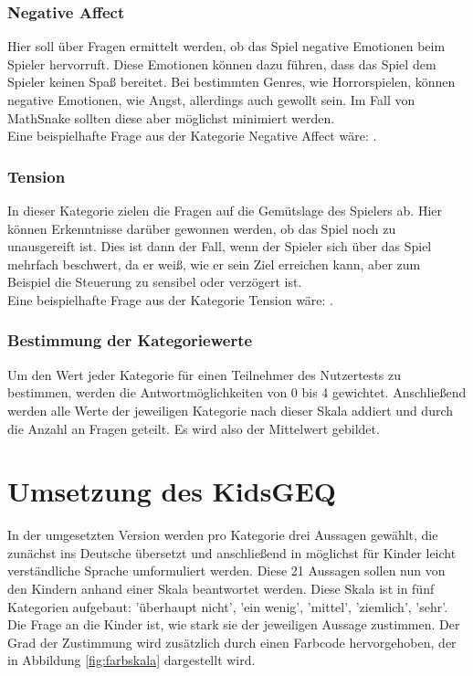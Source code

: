 \subsubsection{Negative Affect}
Hier soll über Fragen ermittelt werden, ob das Spiel negative Emotionen beim Spieler hervorruft. Diese Emotionen können dazu führen, dass das Spiel dem Spieler keinen Spaß bereitet. Bei bestimmten Genres, wie Horrorspielen, können negative Emotionen, wie Angst, allerdings auch gewollt sein. Im Fall von MathSnake sollten diese aber möglichst minimiert werden.
\\
Eine beispielhafte Frage aus der Kategorie Negative Affect wäre: .
\subsubsection{Tension}
In dieser Kategorie zielen die Fragen auf die Gemütslage des Spielers ab. Hier können Erkenntnisse darüber gewonnen werden, ob das Spiel noch zu unausgereift ist. Dies ist dann der Fall, wenn der Spieler sich über das Spiel mehrfach beschwert, da er weiß, wie er sein Ziel erreichen kann, aber zum Beispiel die Steuerung zu sensibel oder verzögert ist.
\\
Eine beispielhafte Frage aus der Kategorie Tension wäre: .
\subsubsection{Bestimmung der Kategoriewerte}
Um den Wert jeder Kategorie für einen Teilnehmer des Nutzertests zu bestimmen, werden die Antwortmöglichkeiten von 0 bis 4 gewichtet. Anschließend werden alle Werte der jeweiligen Kategorie nach dieser Skala addiert und durch die Anzahl an Fragen geteilt. Es wird also der Mittelwert gebildet. 
\section{Umsetzung des KidsGEQ}
In der umgesetzten Version werden pro Kategorie drei Aussagen gewählt, die zunächst ins Deutsche übersetzt und anschließend in möglichst für Kinder leicht verständliche Sprache umformuliert werden. Diese 21 Aussagen sollen nun von den Kindern anhand einer Skala beantwortet werden. Diese Skala ist in fünf Kategorien aufgebaut: 'überhaupt nicht', 'ein wenig', 'mittel', 'ziemlich', 'sehr'. Die Frage an die Kinder ist, wie stark sie der jeweiligen Aussage zustimmen. Der Grad der Zustimmung wird zusätzlich durch einen Farbcode hervorgehoben, der in Abbildung \ref{fig:farbskala} dargestellt wird. 

